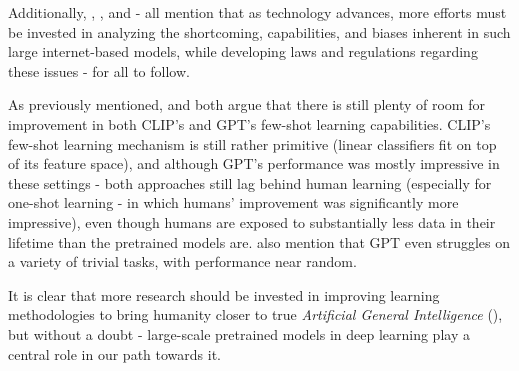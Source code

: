 \documentclass{article}
\begin{document}
\medskip
\noindent
Additionally, \citet{brown2020gpt3}, \citet{radford2021clip}, and \citet{tamkin2021convention} - all mention that as technology advances, more efforts must be invested in analyzing the shortcoming, capabilities, and biases inherent in such large internet-based models, while developing laws and regulations regarding these issues - for all to follow.

\medskip
\noindent
As previously mentioned, \citet{brown2020gpt3} and \citet{radford2021clip} both argue that there is still plenty of room for improvement in both CLIP's and GPT's few-shot learning capabilities. CLIP's few-shot learning mechanism is still rather primitive (linear classifiers fit on top of its feature space), and although GPT's performance was mostly impressive in these settings - both approaches still lag behind human learning (especially for one-shot learning - in which humans' improvement was significantly more impressive), even though humans are exposed to substantially less data in their lifetime than the pretrained models are. \citet{brown2020gpt3} also mention that GPT even struggles on a variety of trivial tasks, with performance near random.

\medskip
\noindent
It is clear that more research should be invested in improving learning methodologies to bring humanity closer to true \emph{Artificial General Intelligence} (\citet{goertzel2014agi}), but without a doubt - large-scale pretrained models in deep learning play a central role in our path towards it.




\newpage
{}
\small{
    
}
\end{document}
